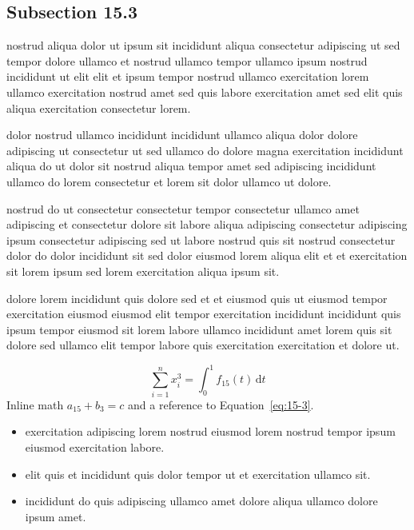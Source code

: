 \documentclass{article}
\begin{document}
\subsection{Subsection 15.3}\label{sec:15-3}
nostrud aliqua dolor ut ipsum sit incididunt aliqua consectetur adipiscing ut sed tempor dolore ullamco et nostrud ullamco tempor ullamco ipsum nostrud incididunt ut elit elit et ipsum tempor nostrud ullamco exercitation lorem ullamco exercitation nostrud amet sed quis labore exercitation amet sed elit quis aliqua exercitation consectetur lorem.

dolor nostrud ullamco incididunt incididunt ullamco aliqua dolor dolore adipiscing ut consectetur ut sed ullamco do dolore magna exercitation incididunt aliqua do ut dolor sit nostrud aliqua tempor amet sed adipiscing incididunt ullamco do lorem consectetur et lorem sit dolor ullamco ut dolore.

nostrud do ut consectetur consectetur tempor consectetur ullamco amet adipiscing et consectetur dolore sit labore aliqua adipiscing consectetur adipiscing ipsum consectetur adipiscing sed ut labore nostrud quis sit nostrud consectetur dolor do dolor incididunt sit sed dolor eiusmod lorem aliqua elit et et exercitation sit lorem ipsum sed lorem exercitation aliqua ipsum sit.

dolore lorem incididunt quis dolore sed et et eiusmod quis ut eiusmod tempor exercitation eiusmod eiusmod elit tempor exercitation incididunt incididunt quis ipsum tempor eiusmod sit lorem labore ullamco incididunt amet lorem quis sit dolore sed ullamco elit tempor labore quis exercitation exercitation et dolore ut.

\begin{equation}\label{eq:15-3}
  \sum_{i=1}^{n} x_i^{3} = \int_0^1 f_{15}(t)\,\mathrm{d}t
\end{equation}
Inline math $a_{15} + b_{3} = c$ and a reference to Equation~\eqref{eq:15-3}.

\begin{itemize}
  \item exercitation adipiscing lorem nostrud eiusmod lorem nostrud tempor ipsum eiusmod exercitation labore.
  \item elit quis et incididunt quis dolor tempor ut et exercitation ullamco sit.
  \item incididunt do quis adipiscing ullamco amet dolore aliqua ullamco dolore ipsum amet.
\end{itemize}
\end{document}
